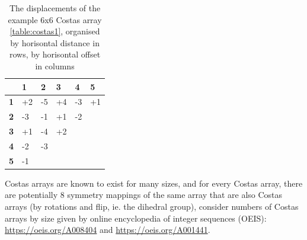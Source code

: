 \documentclass[
10pt, %
a4paper, %
oneside, %
headinclude,footinclude, %
BCOR5mm, %
]{scrartcl}
\begin{document}
\begin{table}[h]
\centering
\begin{tabular}{l|l|llll}
\cline{2-6}
                                 & \textbf{1} & \multicolumn{1}{l|}{\textbf{2}} & \multicolumn{1}{l|}{\textbf{3}} & \multicolumn{1}{l|}{\textbf{4}} & \multicolumn{1}{l|}{\textbf{5}} \\ \hline
\multicolumn{1}{|l|}{\textbf{1}} & +2         & \multicolumn{1}{l|}{-5}         & \multicolumn{1}{l|}{+4}         & \multicolumn{1}{l|}{-3}         & \multicolumn{1}{l|}{+1}         \\ \hline
\multicolumn{1}{|l|}{\textbf{2}} & -3         & \multicolumn{1}{l|}{-1}         & \multicolumn{1}{l|}{+1}         & \multicolumn{1}{l|}{-2}         &                                 \\ \cline{1-5}
\multicolumn{1}{|l|}{\textbf{3}} & +1         & \multicolumn{1}{l|}{-4}         & \multicolumn{1}{l|}{+2}         &                                 &                                 \\ \cline{1-4}
\multicolumn{1}{|l|}{\textbf{4}} & -2         & \multicolumn{1}{l|}{-3}         &                                 &                                 &                                 \\ \cline{1-3}
\multicolumn{1}{|l|}{\textbf{5}} & -1         &                                 &                                 &                                 &                                 \\ \cline{1-2}
\end{tabular}
\caption{The displacements of the example 6x6 Costas array \ref{table:costas1}, organised by horisontal distance in rows, by horisontal offset in columns}\label{table:costas2}
\end{table}

Costas arrays are known to exist for many sizes, and for every Costas array, there are potentially 8 symmetry mappings of the same array that are also Costas arrays (by rotations and flip, ie. the dihedral group), consider numbers of Costas arrays by size given by online encyclopedia of integer sequences (OEIS): \url{https://oeis.org/A008404} and \url{https://oeis.org/A001441}.
\end{document}
